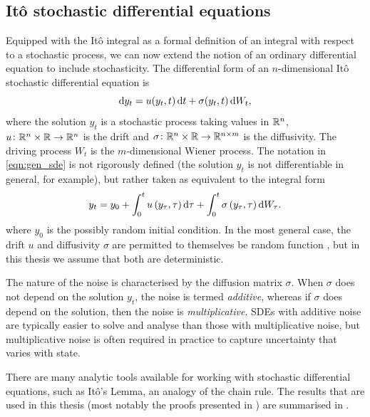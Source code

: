\subsection{It\^o stochastic differential equations}\label{sec:bkg_sde}
Equipped with the It\^o integral as a formal definition of an integral with respect to a stochastic process, we can now extend the notion of an ordinary differential equation to include stochasticity.
The differential form of an \(n\)-dimensional It\^o stochastic differential equation is
\begin{equation}
	\dif y_t = u\!\left(y_t, t\right)\dif t + \sigma\!\left(y_t, t\right)\dif W_t,
	\label{eqn:gen_sde}
\end{equation}
where the solution \(y_t\) is a stochastic process taking values in \(\mathbb{R}^n\), \(u\colon \mathbb{R}^n \times \mathbb{R} \to \mathbb{R}^n\) is the drift and \(\sigma\colon \mathbb{R}^n \times \mathbb{R} \to \mathbb{R}^{n\times m}\) is the diffusivity.
The driving process \(W_t\) is the \(m\)-dimensional Wiener process.
The notation in \cref{eqn:gen_sde} is not rigorously defined (the solution \(y_t\) is not differentiable in general, for example), but rather taken as equivalent to the integral form
\begin{equation}
	y_t = y_0 + \int_0^t{u\left(y_\tau, \tau\right)\dif\tau} + \int_0^t{\sigma\left(y_\tau, \tau\right)\dif W_\tau}.
	\label{eqn:gen_sde_int}
\end{equation}
where \(y_0\) is the possibly random initial condition.
In the most general case, the drift \(u\) and diffusivity \(\sigma\) are permitted to themselves be random function%
, but in this thesis we assume that both are deterministic.

The nature of the noise is characterised by the diffusion matrix \(\sigma\).
When \(\sigma\) does not depend on the solution \(y_t\), the noise is termed \emph{additive}, whereas if \(\sigma\) does depend on the solution, then the noise is \emph{multiplicative}.
SDEs with additive noise are typically easier to solve and analyse than those with multiplicative noise, but multiplicative noise is often required in practice to capture uncertainty that varies with state.

There are many analytic tools available for working with stochastic differential equations, such as It\^o's Lemma, an analogy of the chain rule.
The results that are used in this thesis (most notably the proofs presented in ) are summarised in .

